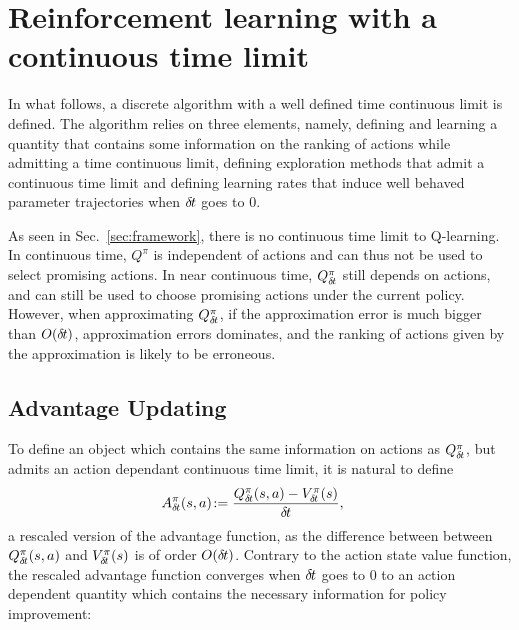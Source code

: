 \section{Reinforcement learning with a continuous time limit}

In what follows, a discrete algorithm with a well defined time continuous
limit is defined. The algorithm relies on three elements, namely, defining and
learning a quantity that contains some information on the ranking of actions
while admitting a time continuous limit, defining exploration methods that
admit a continuous time limit and defining learning rates that induce well
behaved parameter trajectories when ${\delta\hspace{-.1em}t}$ goes to $0$.

As seen in Sec.~\ref{sec:framework}, there is no continuous time limit to
Q-learning. In continuous time, $Q^\pi$ is independent of actions and can thus
not be used to select promising actions.  In near continuous time, $Q^\pi_{\delta\hspace{-.1em}t}$
still depends on actions, and can still be used to choose promising actions
under the current policy. However, when approximating $Q^\pi_{\delta\hspace{-.1em}t}$, if the
approximation error is much bigger than $O({\delta\hspace{-.1em}t})$, approximation errors
dominates, and the ranking of actions given by the approximation is likely to
be erroneous.

\subsection{Advantage Updating}
\label{subsec:reparam}
To define an object which contains the same information on actions as
$Q^\pi_{\delta\hspace{-.1em}t}$, but admits an action dependant continuous time limit, it is
natural to define \cite{adv_upd}
\begin{align}
	A^\pi_{\delta\hspace{-.1em}t}(s, a) &\colon\hspace{-.6em}= \frac{Q^\pi_{\delta\hspace{-.1em}t}(s,a) - V^\pi_{\delta\hspace{-.1em}t}(s)}{{\delta\hspace{-.1em}t}},
    \label{eq:adv}
\end{align}
a rescaled version of the advantage function, as the difference between between
$Q^\pi_{\delta\hspace{-.1em}t}(s, a)$ and $V^\pi_{\delta\hspace{-.1em}t}(s)$ is of order $O({\delta\hspace{-.1em}t})$.
Contrary to the action state value function, the rescaled advantage function converges when ${\delta\hspace{-.1em}t}$ goes to $0$
to an action dependent quantity which contains the necessary information for policy improvement:


